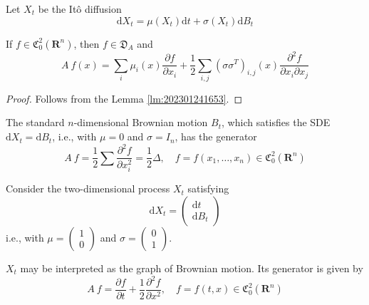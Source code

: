 \begin{theorem}
    Let $X_t$ be the Itô diffusion 
    \[
        \mathrm{d} X_t = \mu(X_t) \mathrm{d}t + \sigma(X_t) \mathrm{d}B_t
    \]

    If $f \in \mathfrak{C}_0^2(\textbf{R}^n)$, then $f \in \mathfrak{D}_A$ and 
    \begin{equation}\label{thm:202301261616}
        A~f(x) = \sum_i \mu_i(x) \frac{\partial f}{\partial x_i} + \frac{1}{2} \sum_{i, j} (\sigma \sigma^T)_{i,j}(x) \frac{\partial^2 f}{\partial x_i \partial x_j}
    \end{equation}
\end{theorem}

\begin{proof}
    Follows from the Lemma \ref{lm:202301241653}.
\end{proof}

\begin{example}
    The standard $n$-dimensional Brownian motion $B_t$, which satisfies the SDE $ \mathrm{d} X_t = \mathrm{d}B_t$, i.e., with $\mu = 0$ and $\sigma = I_n$, has the generator 
    \[
        A~f = \frac{1}{2} \sum \frac{\partial^2 f}{\partial x_i^2} = \frac{1}{2} \Delta, \quad f = f(x_1, \ldots, x_n) \in \mathfrak{C}_0^2(\textbf{R}^n)
    \]
\end{example}

\begin{example}
    Consider the two-dimensional process $X_t$ satisfying 
    \[
        \mathrm{d}X_t = \begin{pmatrix}
            \mathrm{d}t \\
            \mathrm{d}B_t
        \end{pmatrix}
    \]
    i.e., with $\mu = \begin{pmatrix}
        1 \\
        0
    \end{pmatrix}$ and $\sigma = \begin{pmatrix}
        0 \\
        1
    \end{pmatrix}$. 

    $X_t$ may be interpreted as the graph of Brownian motion. Its generator is given by 
    \[
        A~f = \frac{\partial f}{\partial t} + \frac{1}{2} \frac{\partial^2 f}{\partial x^2}, \quad f = f(t,x) \in \mathfrak{C}_0^2(\textbf{R}^n)
    \]
\end{example}

